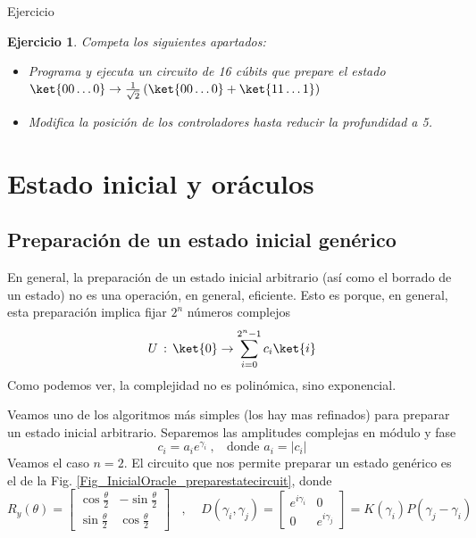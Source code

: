 \documentclass[a4paper,11pt]{book} %
\newtheorem{ejercicio_contador}{Ejercicio}
\newcommand{\Ejercicio}[1]{
		\begin{mybox_gray}{Ejercicio} 
			\begin{ejercicio_contador}
				 #1 
			\end{ejercicio_contador} 
		\end{mybox_gray}
	}
\numberwithin{equation}{chapter}
\begin{document}
	\Ejercicio{
		Competa los siguientes apartados:	
	\begin{itemize} 
		\item[1.] Programa y ejecuta un circuito de 16 cúbits que prepare el estado $\ket{00\ldots 0} \to \frac{1}{\sqrt{2}}\left(\ket{00\ldots 0} + \ket{11\ldots 1}\right) $ 
		\item[2.] Modifica la posición de los controladores hasta reducir la profundidad a 5.
	\end{itemize}
	}

    


\chapter{Estado inicial y oráculos}


    \section{Preparación de un estado inicial genérico}

En general, la preparación de un estado inicial arbitrario (así como el borrado de un estado) no es una operación, en general, eficiente. Esto es porque, en general, esta preparación implica fijar $2^n$ números complejos
\begin{equation}
U \, : \, \ket{0} \rightarrow \sum_{i=0}^{2^n-1} c_i \ket{i}
\end{equation}
Como podemos ver, la complejidad no es polinómica, sino exponencial. 

Veamos uno de los algoritmos más simples (los hay mas refinados) para preparar un estado inicial arbitrario. Separemos las amplitudes complejas en módulo y fase 
\begin{equation}
c_i = a_i e^{\gamma_i} ~, ~~~~ \text{donde } a_i = |c_i|
\end{equation}
Veamos el caso $n=2$. El circuito que nos permite preparar un estado genérico es el de la Fig. \ref{Fig_InicialOracle_preparestatecircuit}, donde 
\begin{equation}
R_y(\theta) = \begin{bmatrix} \cos\frac{\theta}{2} & -\sin\frac{\theta}{2} \\
 \sin\frac{\theta}{2}  & \cos\frac{\theta}{2} \end{bmatrix}~~~~, ~~~~~
D(\gamma_i,\gamma_j ) = \begin{bmatrix} e^{i\gamma_i} & 0 \\ 0 & e^{i\gamma_j} \end{bmatrix} = K(\gamma_i) P(\gamma_j-\gamma_i)
\end{equation}
\end{document}
